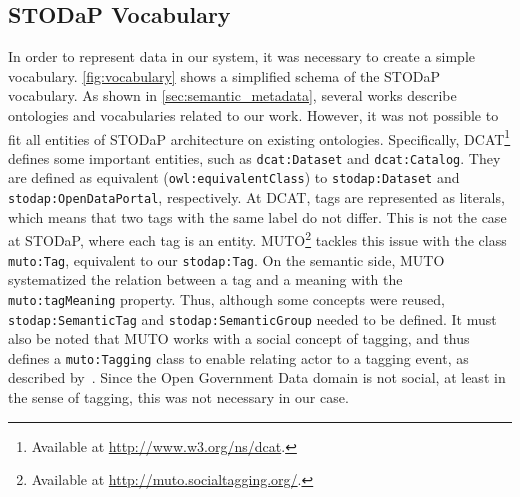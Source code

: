 

\subsection{STODaP Vocabulary}
\label{sec:stodap_vocabulary}

In order to represent data in our system, it was necessary to create a simple vocabulary.
\autoref{fig:vocabulary} shows a simplified schema of the STODaP vocabulary.
As shown in \autoref{sec:semantic_metadata}, several works describe ontologies and vocabularies related to our work.
However, it was not possible to fit all entities of STODaP architecture on existing ontologies.
Specifically, DCAT\footnote{Available at \url{http://www.w3.org/ns/dcat}.} defines some important entities, such as \texttt{dcat:Dataset} and \texttt{dcat:Catalog}.
They are defined as equivalent (\texttt{owl:equivalentClass}) to \texttt{stodap:Dataset} and \texttt{stodap:OpenDataPortal}, respectively.
At DCAT, tags are represented as literals, which means that two tags with the same label do not differ.
This is not the case at STODaP, where each tag is an entity.
MUTO\footnote{Available at \url{http://muto.socialtagging.org/}.} tackles this issue with the class \texttt{muto:Tag}, equivalent to our \texttt{stodap:Tag}.
On the semantic side, MUTO systematized the relation between a tag and a meaning with the \texttt{muto:tagMeaning} property.
Thus, although some concepts were reused, \texttt{stodap:SemanticTag} and \texttt{stodap:SemanticGroup} needed to be defined.
It must also be noted that MUTO works with a social concept of tagging, and thus defines a \texttt{muto:Tagging} class to enable relating actor to a tagging event, as described by~.
Since the Open Government Data domain is not social, at least in the sense of tagging, this was not necessary in our case.

